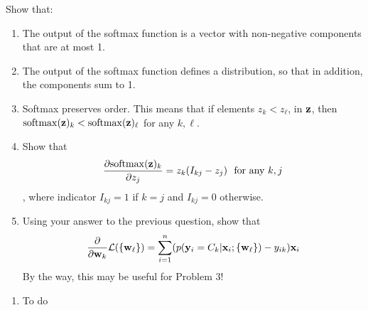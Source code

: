 \documentclass[submit]{harvardml}
\begin{document}
\begin{problem}
Show that:
\begin{enumerate}
  \item The output of the softmax function is a vector with non-negative components
    that are at most 1. 
%
  \item The output of the softmax function defines a distribution,
so that in addition, the components sum to 1.
%
  \item Softmax preserves order. This means that if elements $z_k < z_\ell$,
in $\mathbf{z}$, then  $\mathrm{softmax}(\mathbf{z})_k < \mathrm{softmax}(\mathbf{z})_{\ell}$ for any $k,\ell$. 
  \item Show that \[\frac{\partial \mathrm{softmax}(\boldz)_k }{\partial z_j} = z_k (I_{kj} - z_j) \ \ \text{for\ any\ } k, j  \],
%
where indicator $I_{kj}=1$ if $k=j$ and $I_{kj}=0$ otherwise.
%
  \item Using your answer to the previous question, show that
    \[ \frac{\partial }{\partial \mathbf{w}_k} \mathcal{L}(\{\mathbf{w}_{\ell}\}) = \sum_{i=1}^n (p(\mathbf{y}_i = C_k | \mathbf{x}_i; \{\mathbf{w}_\ell\}) - y_{ik} ) \mathbf{x}_i  \]
    By the way, this may be useful for Problem 3!
\end{enumerate}
\end{problem}


\begin{solution}
\begin{sol}
\begin{enumerate}
\item To do
\end{enumerate}
\end{sol}
\end{solution}
\end{document}
